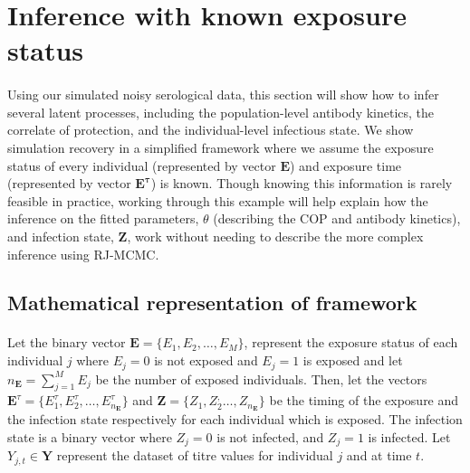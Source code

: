 
\section{Inference with known exposure status}

\paragraph{}Using our simulated noisy serological data, this section will show how to infer several latent processes, including the population-level antibody kinetics, the correlate of protection, and the individual-level infectious state. We show simulation recovery in a simplified framework where we assume the exposure status of every individual (represented by vector $\mathbf{E}$) and exposure time (represented by vector $\mathbf{E^\tau}$) is known. Though knowing this information is rarely feasible in practice, working through this example will help explain how the inference on the fitted parameters, $\theta$ (describing the COP and antibody kinetics), and infection state, $\mathbf{Z}$, work without needing to describe the more complex inference using RJ-MCMC. 

\subsection{Mathematical representation of framework}

\paragraph{}Let the binary vector $\mathbf{E} = \{ E_1, E_2, \dots, E_M\}$, represent the exposure status of each individual $j$ where $E_j = 0$ is not exposed and $E_j = 1$ is exposed and let $n_\mathbf{E} = \sum_{j = 1}^ME_j$ be the number of exposed individuals. Then, let the vectors $\mathbf{E}^\tau = \{E_1^\tau, E_2^\tau, \dots, E^\tau_{n_\mathbf{E}}\}$ and $\mathbf{Z} = \{Z_1, Z_2^, \dots, Z_{n_\mathbf{E}}\}$ be the timing of the exposure and the infection state respectively for each individual which is exposed. The infection state is a binary vector where $Z_j = 0$ is not infected, and $Z_j = 1$ is infected. Let $Y_{j, t} \in \mathbf{Y}$ represent the dataset of titre values for individual $j$ and at time $t$. 

